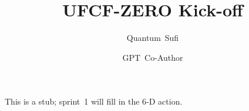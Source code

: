 \documentclass{article}
\title{UFCF-ZERO Kick-off}
\author{Quantum Sufi \and GPT Co-Author}
\begin{document}
\maketitle
This is a stub; sprint 1 will fill in the 6‑D action.
\end{document}
